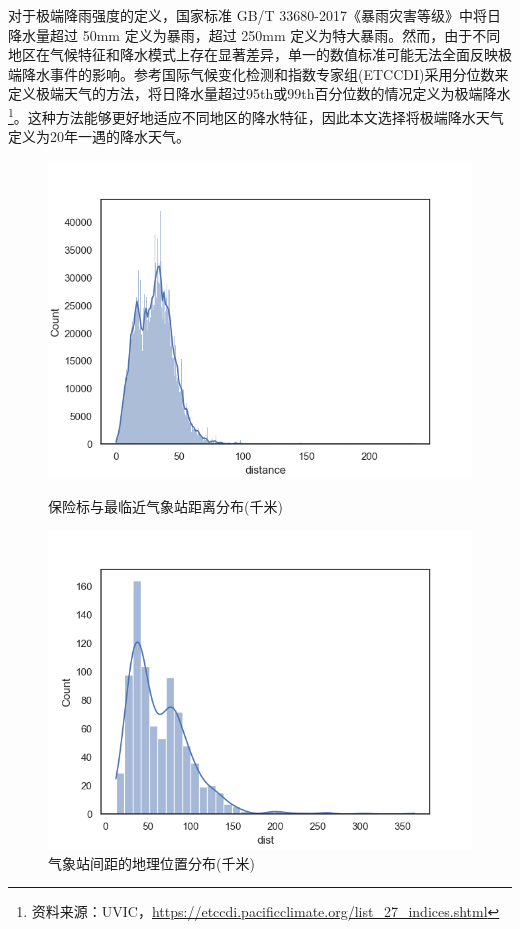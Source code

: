 对于极端降雨强度的定义，国家标准 GB/T 33680-2017《暴雨灾害等级》中将日降水量超过 50mm 定义为暴雨，超过 250mm 定义为特大暴雨。然而，由于不同地区在气候特征和降水模式上存在显著差异，单一的数值标准可能无法全面反映极端降水事件的影响。参考国际气候变化检测和指数专家组(ETCCDI)采用分位数来定义极端天气的方法，将日降水量超过95th或99th百分位数的情况定义为极端降水\footnote{资料来源：UVIC，\url{https://etccdi.pacificclimate.org/list_27_indices.shtml}}。这种方法能够更好地适应不同地区的降水特征\citep{karl1999clivar}，因此本文选择将极端降水天气定义为20年一遇的降水天气。
\begin{figure}[H]
    \begin{minipage}{0.48\linewidth}
        \centering
        \includegraphics[width=\textwidth]{lib/img/distance.png}
        \caption{保险标与最临近气象站距离分布(千米)}
        \label{fig:distance}
    \end{minipage}
    \begin{minipage}{0.48\linewidth}
        \centering
        \includegraphics[width=\textwidth]{lib/img/locations_distance.png}
        \caption{气象站间距的地理位置分布(千米)}
        \label{fig:locations}
    \end{minipage}
\end{figure}


